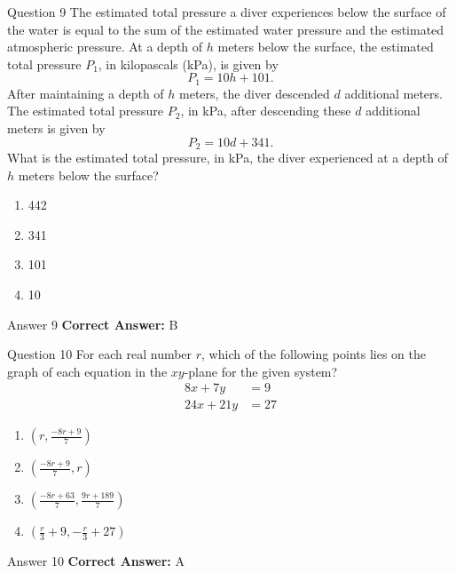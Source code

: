 \documentclass{beamer}
\begin{document}
\begin{frame}{Question 9}
\small
The estimated total pressure a diver experiences below the surface of the water
is equal to the sum of the estimated water pressure and the estimated atmospheric
pressure. At a depth of \(h\) meters below the surface, the estimated total
pressure \(P_1\), in kilopascals (kPa), is given by
\[
P_1=10h+101.
\]
After maintaining a depth of \(h\) meters, the diver descended \(d\) additional
meters. The estimated total pressure \(P_2\), in kPa, after descending these
\(d\) additional meters is given by
\[
P_2=10d+341.
\]
What is the estimated total pressure, in kPa, the diver experienced at a depth
of \(h\) meters below the surface?
\vspace{0.35cm}
\begin{enumerate}
    \item[A.] 442
    \item[B.] 341
    \item[C.] 101
    \item[D.] 10
\end{enumerate}
\end{frame}
\begin{frame}{Answer 9}
\small
\textbf{Correct Answer:} B
\end{frame}

\begin{frame}{Question 10}
\small
For each real number \(r\), which of the following points lies on the graph of
each equation in the \(xy\)-plane for the given system?
\[
\begin{aligned}
8x+7y&=9\\
24x+21y&=27
\end{aligned}
\]
\vspace{0.35cm}
\begin{enumerate}
    \item[A.] \(\left(r,\frac{-8r+9}{7}\right)\)
    \item[B.] \(\left(\frac{-8r+9}{7},r\right)\)
    \item[C.] \(\left(\frac{-8r+63}{7},\frac{9r+189}{7}\right)\)
    \item[D.] \(\left(\frac r3+9,-\frac r3+27\right)\)
\end{enumerate}
\end{frame}
\begin{frame}{Answer 10}
\small
\textbf{Correct Answer:} A
\end{frame}
\end{document}
